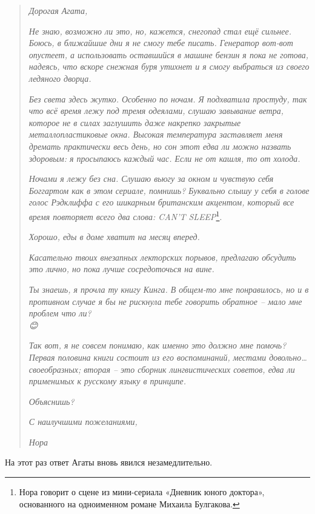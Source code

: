 \documentclass[
  a5paperpaper,
  DIV=11,
  numbers=noendperiod]{scrreprt}
\begin{document}
\begin{quote}
\emph{Дорогая Агата,}

\emph{Не знаю, возможно ли это, но, кажется, снегопад стал ещё сильнее.
Боюсь, в ближайшие дни я не смогу тебе писать. Генератор вот-вот
опустеет, а использовать оставшийся в машине бензин я пока не готова,
надеясь, что вскоре снежная буря утихнет и я смогу выбраться из своего
ледяного дворца.}

\emph{Без света здесь жутко. Особенно по ночам. Я подхватила простуду,
так что всё время лежу под тремя одеялами, слушаю завывание ветра,
которое не в силах заглушить даже накрепко закрытые металлопластиковые
окна. Высокая температура заставляет меня дремать практически весь день,
но сон этот едва ли можно назвать здоровым: я просыпаюсь каждый час.
Если не от кашля, то от холода.}

\emph{Ночами я лежу без сна. Слушаю вьюгу за окном и чувствую себя
Боггартом как в этом сериале, помнишь? Буквально слышу у себя в голове
голос Рэдклиффа с его шикарным британским акцентом, который все время
повторяет всего два слова: CAN'T SLEEP}\footnote{Нора говорит о сцене из
  мини-сериала «Дневник юного доктора», основанного на одноименном
  романе Михаила Булгакова.}.

\emph{Хорошо, еды в доме хватит на месяц вперед.}

\emph{Касательно твоих внезапных лекторских порывов, предлагаю обсудить
это лично, но пока лучше сосредоточься на вине.}

\emph{Ты знаешь, я прочла ту книгу Кинга. В общем-то мне понравилось, но
и в противном случае я бы не рискнула тебе говорить обратное -- мало мне
проблем что ли?\\
😊 }

\emph{Так вот, я не совсем понимаю, как именно это должно мне помочь?
Первая половина книги состоит из его воспоминаний, местами
довольно\ldots своеобразных; вторая -- это сборник лингвистических
советов, едва ли применимых к русскому языку в принципе.}

\emph{Объяснишь?}

\emph{С наилучшими пожеланиями,}

\emph{Нора}
\end{quote}

На этот раз ответ Агаты вновь явился незамедлительно.
\end{document}
